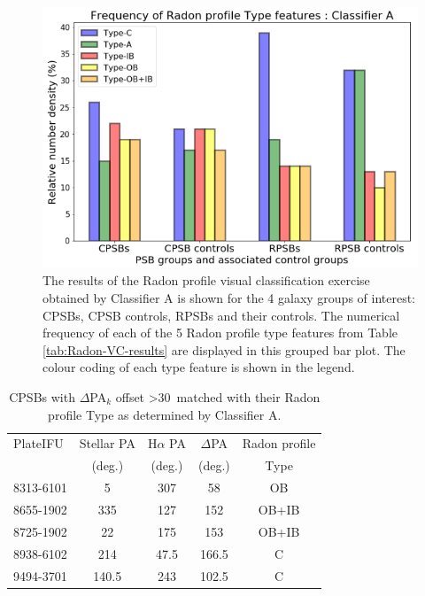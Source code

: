 \begin{figure}
    \centering
    \includegraphics[width=\columnwidth]{images/JupyterPlots/PROFILE-GROUPS-CLASSIFIER-A.png}
    \caption[Radon profile Type classifications determined by Classifier A]{The results of the Radon profile visual classification exercise obtained by Classifier A is shown for the 4 galaxy groups of interest: CPSBs, CPSB controls, RPSBs and their controls. The numerical frequency of each of the 5 Radon profile type features from Table \ref{tab:Radon-VC-results} are displayed in this grouped bar plot. The colour coding of each type feature is shown in the legend.}
    \label{fig:Radon-grouped-barchart}
\end{figure}

\begin{table}
\centering
\caption{CPSBs with $\Delta$PA$_{k}$ offset \textgreater 30\textdegree\ matched with their Radon profile Type as determined by Classifier A.}
\label{tab:offsetCPSBs-Radon-Type}
\begin{tabular}{lcccc}
\hline
PlateIFU  & Stellar PA & H$\alpha$ PA & $\Delta$PA & Radon profile\\
  & (deg.) & (deg.) & (deg.) & Type \\
\hline
8313-6101 & 5 & 307 & 58 & OB \\
8655-1902 & 335 & 127 & 152 & OB+IB \\
8725-1902 & 22 & 175 & 153 & OB+IB \\
8938-6102 & 214 & 47.5 & 166.5 & C \\
9494-3701 & 140.5 & 243 & 102.5 & C \\
\hline
\end{tabular}
\end{table}

